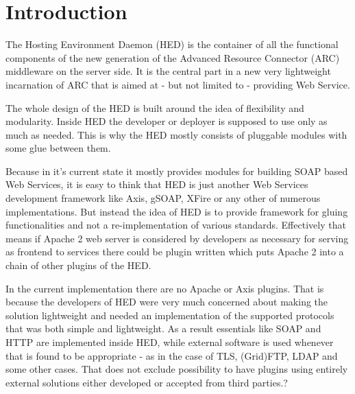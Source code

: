 \documentclass{book}
\begin{document}
\tableofcontents                          %
\newpage

\chapter{Introduction}

The Hosting Environment Daemon (HED) is the container of all the functional components of the new generation of the Advanced Resource Connector (ARC) middleware on the server side. It is the central part in a new very lightweight incarnation of ARC that is aimed at - but not limited to - providing Web Service.

The whole design of the HED is built around the idea of flexibility and modularity. Inside HED the developer or deployer is supposed to use only as much as needed. This is why the HED mostly consists of pluggable modules with some glue between them.

Because in it's current state it mostly provides modules for building SOAP based Web Services, it is easy to think that HED is just another Web Services development framework like Axis, gSOAP, XFire or any other of numerous implementations. But instead the idea of HED is to provide framework for gluing functionalities and not a re-implementation of various standards. Effectively that means if Apache 2 web server is considered by developers as necessary for serving as frontend to services there could be plugin written which puts Apache 2 into a chain of other plugins of the HED.

In the current implementation there are no Apache or Axis plugins. That is because the developers of HED were very much concerned about making the solution lightweight and needed an implementation of the supported protocols that was both simple and lightweight. As a result essentials like SOAP and HTTP are implemented inside HED, while external software is used whenever that is found to be appropriate - as in the case of TLS, (Grid)FTP, LDAP and some other cases. That does not exclude possibility to have plugins using entirely external solutions either developed or accepted from third parties.?
\end{document}

